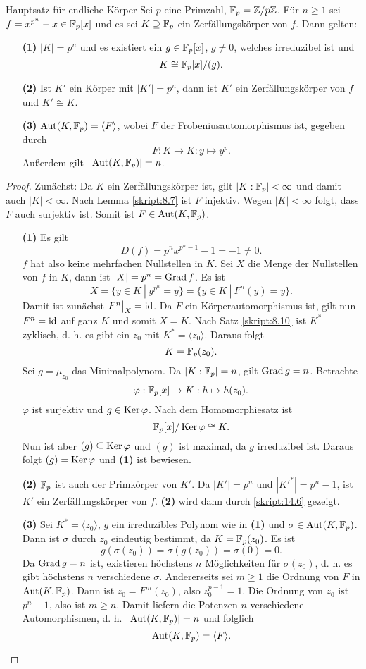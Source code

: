 \begin{genericdf}{Hauptsatz für endliche Körper}\label{skript:14.12}
	Sei $p$ eine Primzahl, $\mathbb{F}_p=\mathbb{Z}/p\mathbb{Z}$. Für $n\geq1$ sei $f=x^{p^n}-x\in\mathbb{F}_p[x]$ und es sei $K\supseteq\mathbb{F}_p$ ein Zerfällungskörper von $f$. Dann gelten:
	\begin{itemize}
		\item[\textbf{(1)}]
		$|K|=p^n$ und es existiert ein $g\in\mathbb{F}_p[x]$, $g\neq0$, welches irreduzibel ist und
		\[K\cong\mathbb{F}_p[x]/(g).\]
		\item[\textbf{(2)}]
		Ist $K'$ ein Körper mit $|K'|=p^n$, dann ist $K'$ ein Zerfällungskörper von $f$ und $K'\cong K$.
		\item[\textbf{(3)}]
		$\operatorname{Aut}(K,\mathbb{F}_p)=\langle F\rangle$, wobei $F$ der Frobeniusautomorphismus ist, gegeben durch
		\[F: K\to K: y\mapsto y^p.\]
		Außerdem gilt $|\operatorname{Aut}(K,\mathbb{F}_p)|=n$.
	\end{itemize}
\end{genericdf}
\begin{proof}
	Zunächst: Da $K$ ein Zerfällungskörper ist, gilt $|K:\mathbb{F}_p|<\infty$ und damit auch $|K|<\infty$. Nach Lemma \ref{skript:8.7} ist $F$ injektiv. Wegen $|K|<\infty$ folgt, dass $F$ auch surjektiv ist. Somit ist $F\in\operatorname{Aut}(K,\mathbb{F}_p)$.
	\begin{itemize}
		\item[\textbf{(1)}]
		Es gilt
		\[D(f)=p^nx^{p^n-1}-1=-1\neq0.\]
		$f$ hat also keine mehrfachen Nullstellen in $K$. Sei $X$ die Menge der Nullstellen von $f$ in $K$, dann ist $|X|=p^n=\operatorname{Grad} f$. Es ist
		\[X=\{y\in K\ |\ y^{p^n}=y\}=\{y\in K\ |\ F^n(y)=y\}.\]
		Damit ist zunächst $F^n\big|_X=\operatorname{id}$. Da $F$ ein Körperautomorphismus ist, gilt nun $F^n=\operatorname{id}$ auf ganz $K$ und somit $X=K$. Nach Satz \ref{skript:8.10} ist $K^\ast$ zyklisch, d. h. es gibt ein $z_0$ mit $K^\ast=\langle z_0\rangle$. Daraus folgt
		\[K=\mathbb{F}_p(z_0).\]
		Sei $g=\mu_{z_0}$ das Minimalpolynom. Da $|K:\mathbb{F}_p|=n$, gilt $\operatorname{Grad} g=n$. Betrachte
		\[\varphi: \mathbb{F}_p[x]\to K: h\mapsto h(z_0).\]
		$\varphi$ ist surjektiv und $g\in\operatorname{Ker}\varphi$. Nach dem Homomorphiesatz ist
		\[\mathbb{F}_p[x]/\operatorname{Ker}\varphi\cong K.\]
		Nun ist aber $(g)\subseteq\operatorname{Ker}\varphi$ und $(g)$ ist maximal, da $g$ irreduzibel ist. Daraus folgt $(g)=\operatorname{Ker}\varphi$ und \textbf{(1)} ist bewiesen.
		\item[\textbf{(2)}]
		$\mathbb{F}_p$ ist auch der Primkörper von $K'$. Da $|K'|=p^n$ und $|K'^\ast|=p^n-1$, ist $K'$ ein Zerfällungskörper von $f$. \textbf{(2)} wird dann durch \ref{skript:14.6} gezeigt.
		\item[\textbf{(3)}]
		Sei $K^\ast=\langle z_0\rangle$, $g$ ein irreduzibles Polynom wie in \textbf{(1)} und $\sigma\in\operatorname{Aut}(K,\mathbb{F}_p)$. Dann ist $\sigma$ durch $z_0$ eindeutig bestimmt, da $K=\mathbb{F}_p(z_0)$. Es ist
		\[g(\sigma(z_0))=\sigma(g(z_0))=\sigma(0)=0.\]
		Da $\operatorname{Grad} g=n$ ist, existieren höchstens $n$ Möglichkeiten für $\sigma(z_0)$, d. h. es gibt höchstens $n$ verschiedene $\sigma$. Andererseits sei $m\geq1$ die Ordnung von $F$ in $\operatorname{Aut}(K,\mathbb{F}_p)$. Dann ist $z_0=F^m(z_0)$, also $z_0^{p-1}=1$. Die Ordnung von $z_0$ ist $p^n-1$, also ist $m\geq n$. Damit liefern die Potenzen $n$ verschiedene Automorphismen, d. h. $|\operatorname{Aut}(K,\mathbb{F}_p)|=n$ und folglich
		\[\operatorname{Aut}(K,\mathbb{F}_p)=\langle F\rangle.\]
	\end{itemize}
\end{proof}


